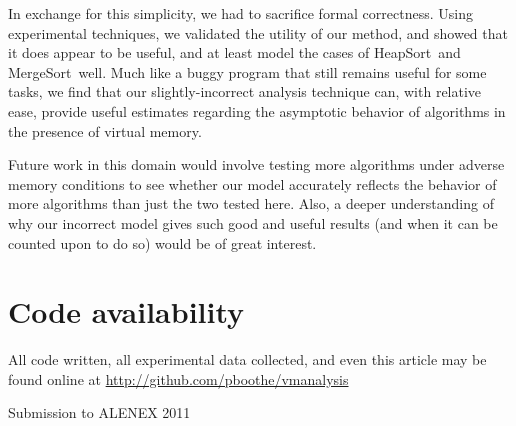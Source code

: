 \documentclass[11pt]{article}
\newcommand{\heapsort}{{\sc HeapSort}}
\newcommand{\mergesort}{{\sc MergeSort}}
\begin{document}
In exchange for this simplicity, we had to sacrifice formal correctness.  Using
experimental techniques, we validated the utility of our method, and showed
that it does appear to be useful, and at least model the cases of \heapsort\
and \mergesort\ well.  Much like a buggy program that still remains useful for
some tasks, we find that our slightly-incorrect analysis technique can, with
relative ease, provide useful estimates regarding the asymptotic behavior of
algorithms in the presence of virtual memory.

Future work in this domain would involve testing more algorithms under adverse
memory conditions to see whether our model accurately reflects the behavior of
more algorithms than just the two tested here.  Also, a deeper understanding of
why our incorrect model gives such good and useful results (and when it can be
counted upon to do so) would be of great interest.




\appendix

\section{Code availability}

All code written, all experimental data collected, and even this article may be found online at \url{http://github.com/pboothe/vmanalysis}


Submission to ALENEX 2011
\end{document}
